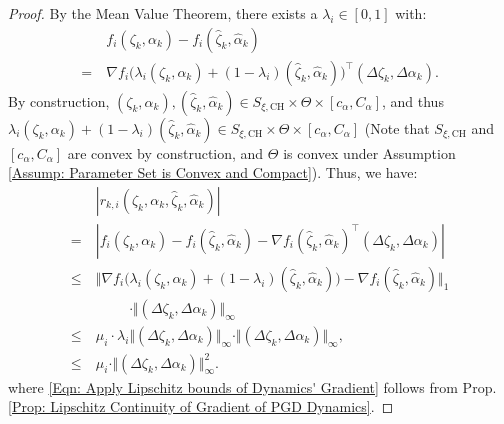 \documentclass[letterpaper, 10 pt, conference]{ieeeconf}
\newcommand{\?}{\stackrel{?}{=}}
\newcommand{\paramSet}{\Theta}
\newcommand{\var}{\xi}
\newcommand{\ratePGDNominal}{\hat\ratePGD}
\newcommand{\ratePGDError}{\Delta\ratePGD}
\newcommand{\linearizationError}{r}
\newcommand{\ratePGD}{\alpha}
\newcommand{\ratePGDMin}{c_\ratePGD}
\newcommand{\ratePGDMax}{C_\ratePGD}
\newcommand{\state}{\zeta}
\newcommand{\stateNominal}{\hat\state}
\newcommand{\stateError}{\Delta\state}
\newcommand{\dynamicsFullState}{f}
\newcommand{\hessianBound}{\mu}
\newcommand{\varConvexHull}{S_{\var, \text{CH}}}
\begin{document}
\begin{proof}
 By the Mean Value Theorem, there exists a $\lambda_i \in [0, 1]$ with:
{
\setlength{\abovedisplayskip}{3.5pt}
\setlength{\belowdisplayskip}{3.5pt}
\begin{align} \nonumber
    &\dynamicsFullState_i(\state_k, \ratePGD_k) - \dynamicsFullState_i(\stateNominal_k, \ratePGDNominal_k) \\ \nonumber
    = \ &\nabla \dynamicsFullState_i\big( \lambda_i(\state_k, \ratePGD_k) + (1 - \lambda_i)(\stateNominal_k, \ratePGDNominal_k) \big)^\top (\stateError_k, \ratePGDError_k).
\end{align}
}
\hspace{-1mm}By construction, $(\state_k, \ratePGD_k), (\stateNominal_k, \ratePGDNominal_k) \in \varConvexHull \times \paramSet \times [\ratePGDMin, \ratePGDMax]$, and thus 
$\lambda_i(\state_k, \ratePGD_k) + (1 - \lambda_i)(\stateNominal_k, \ratePGDNominal_k) \in \varConvexHull \times \paramSet \times [\ratePGDMin, \ratePGDMax]$ (Note that $\varConvexHull$ and $[\ratePGDMin, \ratePGDMax]$ are convex by construction, and $\paramSet$ is convex under Assumption \ref{Assump: Parameter Set is Convex and Compact}).
Thus, we have:
{
\setlength{\abovedisplayskip}{3.5pt}
\setlength{\belowdisplayskip}{3.5pt}
\begin{align} \nonumber
    &|\linearizationError_{k,i}(\state_k, \ratePGD_k, \stateNominal_k, \ratePGDNominal_k)| \\ \nonumber
    = \ &|\dynamicsFullState_i(\state_k, \ratePGD_k) - \dynamicsFullState_i(\stateNominal_k, \ratePGDNominal_k) - \nabla \dynamicsFullState_i(\stateNominal_k, \ratePGDNominal_k)^\top (\stateError_k, \ratePGDError_k) | \\ \nonumber
    \leq \ &\Vert \nabla \dynamicsFullState_i\big( \lambda_i(\state_k, \ratePGD_k) + (1 - \lambda_i)(\stateNominal_k, \ratePGDNominal_k) \big) - \nabla \dynamicsFullState_i(\stateNominal_k, \ratePGDNominal_k) \Vert_1 \\ \nonumber
    &\hspace{1cm} \cdot \Vert (\stateError_k, \ratePGDError_k) \Vert_\infty \\ 
    \label{Eqn: Apply Lipschitz bounds of Dynamics' Gradient}
    \leq \ &\mu_i \cdot \lambda_i \Vert (\stateError_k, \ratePGDError_k) \Vert_\infty \cdot \Vert (\stateError_k, \ratePGDError_k) \Vert_\infty,
    \\ \nonumber
    \leq \ &\hessianBound_i \cdot \Vert (\stateError_k, \ratePGDError_k) \Vert_\infty^2.
\end{align}
}
where \eqref{Eqn: Apply Lipschitz bounds of Dynamics' Gradient} follows from Prop. \ref{Prop: Lipschitz Continuity of Gradient of PGD Dynamics}.
\end{proof}
\end{document}
